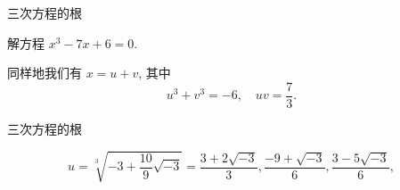 \begin{frame}{三次方程的根}
\onslide<+->
\begin{example}
解方程 $x^3-7x+6=0$.
\end{example}
\onslide<+->
\begin{solution*}
同样地我们有 $x=u+v$, 其中
	\[u^3+v^3=-6,\quad uv=\frac73.\]

\vspace{-1.3\baselineskip}
\end{solution*}
\end{frame}


\begin{frame}{三次方程的根}
\onslide<+->
\begin{solutionc}
	\[u=\sqrt[3]{-3+\frac{10}9\sqrt{-3}}
	=\frac{3+2\sqrt{-3}}3,\frac{-9+\sqrt{-3}}6,\frac{3-5\sqrt{-3}}6,\]
\visible<+->{相应地
	\[v=\frac{3-2\sqrt{-3}}3,\frac{-9-\sqrt{-3}}6,\frac{3+5\sqrt{-3}}6,\]}
\visible<+->{\[x=u+v=2,-3,1.\]}
\vspace{-\baselineskip}
\end{solutionc}
\end{frame}


